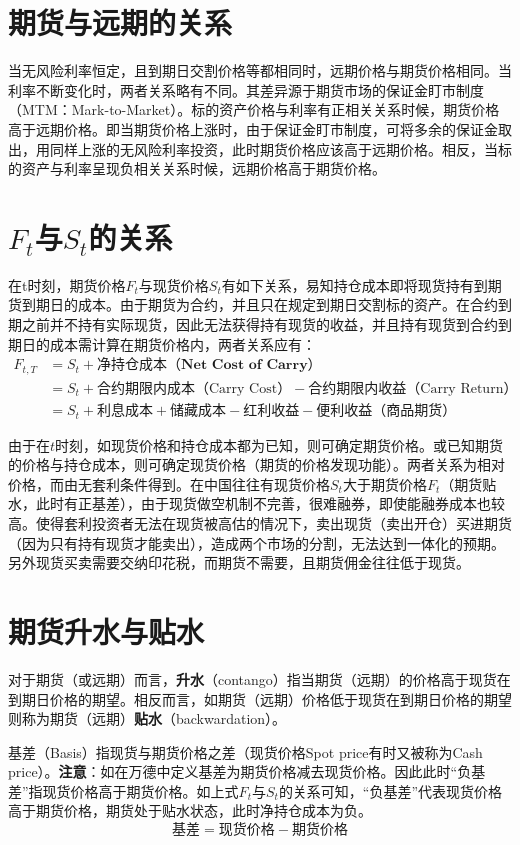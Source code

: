 \documentclass[11pt]{article}
\begin{document}
\section{期货与远期的关系}
当无风险利率恒定，且到期日交割价格等都相同时，远期价格与期货价格相同。当利率不断变化时，两者关系略有不同。其差异源于期货市场的保证金盯市制度（MTM：Mark-to-Market）。标的资产价格与利率有正相关关系时候，期货价格高于远期价格。即当期货价格上涨时，由于保证金盯市制度，可将多余的保证金取出，用同样上涨的无风险利率投资，此时期货价格应该高于远期价格。相反，当标的资产与利率呈现负相关关系时候，远期价格高于期货价格。

\section{$F_t$与$S_t$的关系}
在t时刻，期货价格$F_t$与现货价格$S_t$有如下关系，易知持仓成本即将现货持有到期货到期日的成本。由于期货为合约，并且只在规定到期日交割标的资产。在合约到期之前并不持有实际现货，因此无法获得持有现货的收益，并且持有现货到合约到期日的成本需计算在期货价格内，两者关系应有：
\begin{align*}
    F_{t,T} &= S_t + \textbf{净持仓成本（Net Cost of Carry）} \\
    &= S_t + \text{合约期限内成本（Carry Cost）} - \text{合约期限内收益（Carry Return）} \\
    &= S_t + \text{利息成本} + \text{储藏成本} - \text{红利收益} - \text{便利收益（商品期货）}
\end{align*}

由于在$t$时刻，如现货价格和持仓成本都为已知，则可确定期货价格。或已知期货的价格与持仓成本，则可确定现货价格（期货的价格发现功能）。两者关系为相对价格，而由无套利条件得到。在中国往往有现货价格$S_t$大于期货价格$F_t$（期货贴水，此时有正基差），由于现货做空机制不完善，很难融券，即使能融券成本也较高。使得套利投资者无法在现货被高估的情况下，卖出现货（卖出开仓）买进期货（因为只有持有现货才能卖出），造成两个市场的分割，无法达到一体化的预期。另外现货买卖需要交纳印花税，而期货不需要，且期货佣金往往低于现货。

\section{期货升水与贴水}

对于期货（或远期）而言，\textbf{升水}（contango）指当期货（远期）的价格高于现货在到期日价格的期望。相反而言，如期货（远期）价格低于现货在到期日价格的期望则称为期货（远期）\textbf{贴水}（backwardation）。

基差（Basis）指现货与期货价格之差（现货价格Spot price有时又被称为Cash price）。\textbf{注意}：如在万德中定义基差为期货价格减去现货价格。因此此时“负基差”指现货价格高于期货价格。如上式$F_t$与$S_t$的关系可知，“负基差”代表现货价格高于期货价格，期货处于贴水状态，此时净持仓成本为负。
\begin{equation*}
    \textbf{基差} = \text{现货价格} - \text{期货价格}
\end{equation*}
\end{document}
